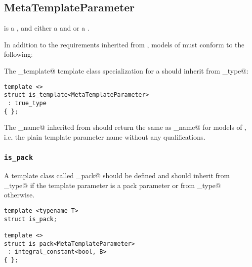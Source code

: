 \subsection{MetaTemplateParameter}
\label{concept-MetaTemplateParameter}

 is a , 
and either a  and  or a .

In addition to the requirements inherited from ,
models of  must conform to the following:

The \verb@is_template@ template class specialization for a  should
inherit from \verb@true_type@:

\begin{verbatim}
template <>
struct is_template<MetaTemplateParameter>
 : true_type
{ };
\end{verbatim}

The \verb@full_name@ inherited from  should return the same 
as \verb@base_name@ for models of , i.e. the plain template parameter
name without any qualifications.

\subsubsection{\texttt{is\_pack}}

A template class called \verb@is_pack@ should be defined and should
inherit from \verb@true_type@ if the template parameter is a pack
parameter or from \verb@false_type@ otherwise.

\begin{verbatim}
template <typename T>
struct is_pack;

template <>
struct is_pack<MetaTemplateParameter>
 : integral_constant<bool, B>
{ };
\end{verbatim}

